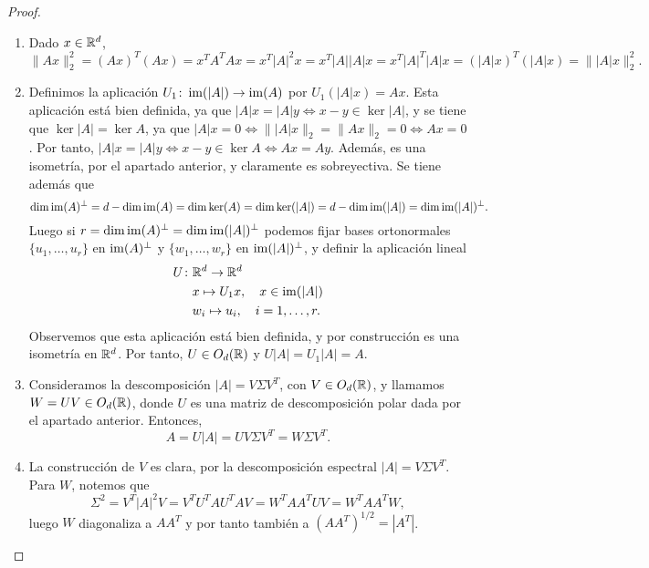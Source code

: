 \begin{proof}~
    \begin{enumerate}
        \item Dado $x \in \mathbb{R}^d$,
        \[ \|Ax\|_2^2 = (Ax)^T(Ax) = x^TA^TAx = x^T|A|^2x = x^T|A||A|x = x^T|A|^T|A|x = (|A|x)^T(|A|x) = \||A|x\|_2^2. \]

        \item Definimos la aplicación $U_1 \colon \operatorname{im}(|A|) \to \operatorname{im}(A)$ por $U_1(|A|x) = Ax$. Esta aplicación está bien definida, ya que $|A|x = |A|y \iff x - y \in \ker|A|$, y se tiene que $\ker|A| = \ker A$, ya que $|A|x = 0 \iff \||A|x\|_2 = \|Ax\|_2 = 0 \iff Ax = 0$. Por tanto, $|A|x = |A|y \iff x - y \in \ker A \iff Ax = Ay$. Además, es una isometría, por el apartado anterior, y claramente es sobreyectiva. Se tiene además que
        \[ \dim \operatorname{im}(A)^{\perp} = d - \dim\operatorname{im}(A) = \dim\ker(A) = \dim\ker(|A|) = d - \dim\operatorname{im}(|A|) = \dim\operatorname{im}(|A|)^{\perp}. \]
        Luego si $r = \dim\operatorname{im}(A)^{\perp} = \dim\operatorname{im}(|A|)^{\perp}$ podemos fijar bases ortonormales $\{u_1,\dots,u_r\}$ en $\operatorname{im}(A)^{\perp}$ y $\{w_1,\dots,w_r\}$ en $\operatorname{im}(|A|)^{\perp}$, y definir la aplicación lineal
        \begin{equation*}
            \begin{split}
                U \colon & \mathbb{R}^d \to \mathbb{R}^d \\
                &x \mapsto U_1x, \quad x \in \operatorname{im}(|A|) \\
                &w_i \mapsto u_i, \quad i = 1,\dots,r. 
            \end{split}
        \end{equation*}
        Observemos que esta aplicación está bien definida, y por construcción es una isometría en $\mathbb{R}^d$. Por tanto, $U \in O_d(\mathbb{R})$ y $U|A| = U_1|A| = A$.

        \item Consideramos la descomposición $|A| = V\Sigma V^T$, con $V \in O_d(\mathbb{R})$, y llamamos $W = UV \in O_d(\mathbb{R})$, donde $U$ es una matriz de descomposición polar dada por el apartado anterior. Entonces,
        \[A = U|A| = UV\Sigma V^T = W\Sigma V^T.  \]

        \item La construcción de $V$ es clara, por la descomposición espectral $|A| = V\Sigma V^T$. Para $W$, notemos que
        \[ \Sigma^2 = V^T|A|^2 V = V^TU^TAU^TAV = W^TAA^TUV = W^TAA^TW, \]
        luego $W$ diagonaliza a $AA^T$ y por tanto también a $(AA^T)^{1/2} = |A^T|$.
\end{enumerate}
\end{proof}


